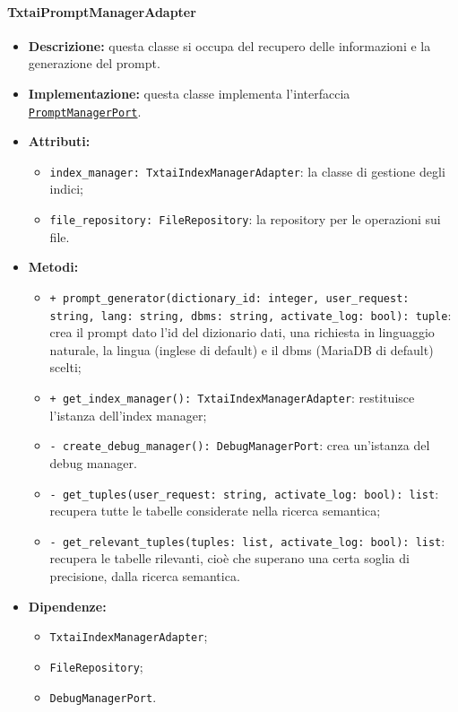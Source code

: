\paragraph{TxtaiPromptManagerAdapter} \label{TxtaiPromptManagerAdapter}
\begin{itemize}
    \item \textbf{Descrizione:} questa classe si occupa del recupero delle informazioni e la generazione del prompt.
    \item \textbf{Implementazione:} questa classe implementa l'interfaccia \hyperref[PromptManagerPort]{\texttt{PromptManagerPort}}.
    \item \textbf{Attributi:}
    \begin{itemize}
        \item \texttt{index\_manager: TxtaiIndexManagerAdapter}: la classe di gestione degli indici;
        \item \texttt{file\_repository: FileRepository}: la repository per le operazioni sui file.
    \end{itemize}
    \item \textbf{Metodi:}
    \begin{itemize}
        \item \texttt{+ prompt\_generator(dictionary\_id: integer, user\_request: string, lang: string, dbms: string, activate\_log: bool): tuple}: crea il prompt dato l'id del dizionario dati, una richiesta in linguaggio naturale, la lingua (inglese di default) e il dbms (MariaDB di default) scelti;
        \item \texttt{+ get\_index\_manager(): TxtaiIndexManagerAdapter}: restituisce l'istanza dell'index manager;
        \item \texttt{- create\_debug\_manager(): DebugManagerPort}: crea un'istanza del debug manager.
        \item \texttt{- get\_tuples(user\_request: string, activate\_log: bool): list}: recupera tutte le tabelle considerate nella ricerca semantica;
        \item \texttt{- get\_relevant\_tuples(tuples: list, activate\_log: bool): list}: recupera le tabelle rilevanti, cioè che superano una certa soglia di precisione, dalla ricerca semantica.
    \end{itemize}
    \item \textbf{Dipendenze:}
    \begin{itemize}
        \item \texttt{TxtaiIndexManagerAdapter};
        \item \texttt{FileRepository};
        \item \texttt{DebugManagerPort}.
    \end{itemize}
\end{itemize} 

